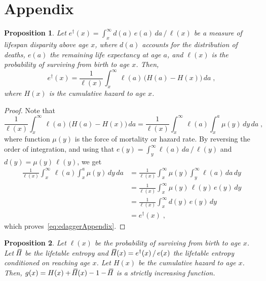 \documentclass[a4paper,twoside, openright, 12pt, leqno]{article}
\newcommand*\xbar[1]{%
   \hbox{%
     \vbox{%
       \hrule height 0.5pt %
       \kern0.3ex%
       \hbox{%
         \kern-0.28em%
         \ensuremath{#1}%
         \kern-0.05em%
       }%
     }%
   }%
}
\newtheorem{theorem}{Proposition}
\begin{document}
\section*{Appendix}

\setcounter{equation}{0}
\renewcommand{\theequation}{A\arabic{equation}}

\begin{theorem}
 Let $e^\dagger(x)=\int_x^\infty d(a)\,e(a)\,da\,/\,\ell(x)$ be a measure of lifespan disparity above age $x$, where $d(a)$ accounts for the distribution of deaths, $e(a)$ the remaining life expectancy at age $a$, and $\ell(x)$ is the probability of surviving from birth to age $x$. Then,
 \begin{equation}
  e^\dagger(x)=\frac{1}{\ell(x)}\int_x^\infty\,\ell(a)\,\big(H(a)-H(x)\big)\,da\;,
  \label{eq:edaggerAppendix}
 \end{equation}
 where $H(x)$ is the cumulative hazard to age $x$.
 \label{prop1}
\end{theorem}

\begin{proof}
  Note that
  $$
  \frac{1}{\ell(x)}\int_x^\infty\,\ell(a)\,\big(H(a)-H(x)\big)\,da=\frac{1}{\ell(x)}\int_x^\infty\,\ell(a)\int_x^a\mu(y)\,dy\,da\;,
  $$
  where function $\mu(y)$ is the force of mortality or hazard rate. By reversing the order of integration, and using that $e(y)=\int_y^\infty\ell(a)\,da\,/\,\ell(y)$ and $d(y)=\mu(y)\,\ell(y)$, we get
  \begin{equation*}
    \begin{split}
      \frac{1}{\ell(x)}\int_x^\infty\,\ell(a)\int_x^a\mu(y)\,dy\,da
	  & = \frac{1}{\ell(x)}\int_x^\infty\mu(y)\int_y^\infty\ell(a)\,da\,dy			\\
	  & = \frac{1}{\ell(x)}\int_x^\infty\mu(y)\,\ell(y)\,e(y)\,dy				\\			
	  & = \frac{1}{\ell(x)}\int_x^\infty d(y)\,e(y)\,dy				\\
	  & = e^\dagger(x)\;,
    \end{split}  
  \end{equation*}
  which proves~\eqref{eq:edaggerAppendix}.
\end{proof}
\medskip

\begin{theorem}
  Let $\ell(x)$ be the probability of surviving from birth to age $x$. Let $\,\xbar{H}$ be the lifetable entropy and $\,\xbar{H}(x)=e^\dagger(x)\,/\,e(x)$ the lifetable entropy conditioned on reaching age $x$. Let $H(x)$ be the cumulative hazard to age $x$. Then, $g(x)=H(x)+\,\xbar{H}(x)-1-\,\xbar{H}$ is a strictly increasing function.
 \label{prop2}
\end{theorem}
\end{document}
